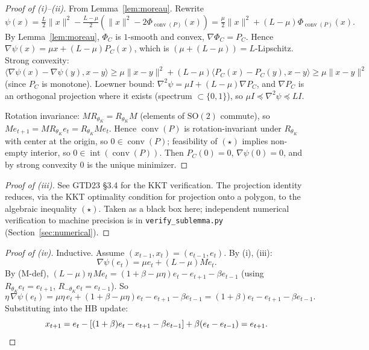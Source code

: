 \documentclass[11pt]{article}
\theoremstyle{definition}
\theoremstyle{remark}
\DeclareMathOperator{\conv}{conv}
\DeclareMathOperator{\interior}{int}
\begin{document}
\begin{proof}[Proof of (i)--(ii)]
From Lemma~\ref{lem:moreau}. Rewrite
\[
  \psi(x) = \tfrac{L}{2}\|x\|^2 - \tfrac{L-\mu}{2}(\|x\|^2 - 2\Phi_{\conv(P)}(x)) = \tfrac{\mu}{2}\|x\|^2 + (L-\mu) \Phi_{\conv(P)}(x).
\]
By Lemma~\ref{lem:moreau}, $\Phi_C$ is $1$-smooth and convex, $\nabla \Phi_C = P_C$. Hence $\nabla \psi(x) = \mu x + (L-\mu) P_C(x)$, which is $(\mu + (L-\mu)) = L$-Lipschitz. Strong convexity: $\langle \nabla \psi(x) - \nabla \psi(y), x - y\rangle \geq \mu \|x-y\|^2 + (L-\mu)\langle P_C(x) - P_C(y), x-y\rangle \geq \mu\|x-y\|^2$ (since $P_C$ is monotone). Loewner bound: $\nabla^2 \psi = \mu I + (L-\mu) \nabla P_C$, and $\nabla P_C$ is an orthogonal projection where it exists (spectrum $\subset \{0,1\}$), so $\mu I \preceq \nabla^2 \psi \preceq L I$.

Rotation invariance: $M R_{\theta_K} = R_{\theta_K} M$ (elements of $\mathrm{SO}(2)$ commute), so $M e_{t+1} = M R_{\theta_K} e_t = R_{\theta_K} M e_t$. Hence $\conv(P)$ is rotation-invariant under $R_{\theta_K}$ with center at the origin, so $0 \in \conv(P)$; feasibility of $(\star)$ implies non-empty interior, so $0 \in \interior(\conv(P))$. Then $P_C(0) = 0$, $\nabla \psi(0) = 0$, and by strong convexity $0$ is the unique minimizer.
\end{proof}

\begin{proof}[Proof of (iii)]
See GTD23 \S3.4 for the KKT verification. The projection identity reduces, via the KKT optimality condition for projection onto a polygon, to the algebraic inequality $(\star)$. Taken as a black box here; independent numerical verification to machine precision is in \texttt{verify\_sublemma.py} (Section~\ref{sec:numerical}).
\end{proof}

\begin{proof}[Proof of (iv)]
Inductive. Assume $(x_{t-1}, x_t) = (e_{t-1}, e_t)$. By (i), (iii):
\[
  \nabla \psi(e_t) = \mu e_t + (L - \mu) M e_t.
\]
By (M-def), $(L - \mu)\eta\, M e_t = (1+\beta-\mu\eta) e_t - e_{t+1} - \beta e_{t-1}$ (using $R_{\theta_K} e_t = e_{t+1}$, $R_{-\theta_K} e_t = e_{t-1}$). So
\[
  \eta\,\nabla \psi(e_t) = \mu \eta\, e_t + (1 + \beta - \mu \eta) e_t - e_{t+1} - \beta e_{t-1} = (1 + \beta) e_t - e_{t+1} - \beta e_{t-1}.
\]
Substituting into the HB update:
\[
  x_{t+1} = e_t - [(1+\beta) e_t - e_{t+1} - \beta e_{t-1}] + \beta(e_t - e_{t-1}) = e_{t+1}. \qedhere
\]
\end{proof}
\end{document}
